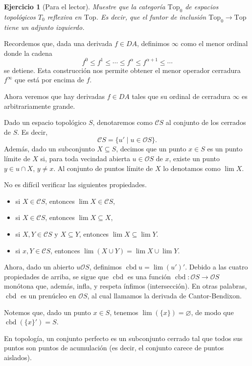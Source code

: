 \documentclass[12pt,letterpaper,titlepage]{article}
\let\emptyset\varnothing
\newtheorem{exe}{Ejercicio}
\theoremstyle{definition}
\renewcommand\cal[1]{\mathcal{#1}}
\newcommand\<{\langle}
\renewcommand\>{\rangle}
\newcommand{\Top}{\mathrm{Top}}
\DeclareMathOperator{\cbd}{cbd}
\begin{document}
\begin{exe}[Para el lector]
    Muestre que la categoría $\Top_0$ de espacios topológicos
    $T_0$ reflexiva en $\Top$.
    Es decir, que el funtor de inclusión $\Top_0\to\Top$
    tiene un adjunto izquierdo.
\end{exe}

Recordemos que, dada una derivada $f\in DA$,
definimos $\infty$ como el menor ordinal donde la cadena
\[
    f^0\leq f^1\leq \cdots\leq f^\alpha \leq f^{\alpha+1} \leq \cdots
\]
se detiene.
Esta construcción nos permite obtener
el menor operador cerradura $f^\infty$
que está por encima de $f$.

Ahora veremos que hay derivadas $f\in DA$ tales que
su ordinal de cerradura $\infty$ es arbitrariamente grande.

Dado un espacio topológico $S$,
denotaremos como $\cal CS$ al conjunto de los cerrados de $S$.
Es decir,
\[
    \cal CS = \{u'\mid u\in\cal OS\}
.\]
Además, dado un subconjunto $X\subseteq S$,
decimos que un punto $x\in S$ es un punto límite de $X$ si,
para toda vecindad abierta $u\in\cal OS$ de $x$,
existe un punto $y\in u\cap X$, $y\neq x$.
Al conjunto de puntos límite de $X$ lo denotamos como $\lim X$.

No es difícil verificar las siguientes propiedades.
\begin{itemize}
    \item si $X\in\cal CS$, entonces $\lim X\in\cal CS$,
    \item si $X\in\cal CS$, entonces $\lim X\subseteq X$,
    \item si $X,Y\in\cal CS$ y $X\subseteq Y$,
        entonces $\lim X\subseteq\lim Y$.
    \item si $x,Y\in\cal CS$,
        entonces $\lim(X\cup Y)=\lim X\cup\lim Y$.
\end{itemize}

Ahora, dado un abierto $u\cal OS$, definimos $\cbd u = \lim(u')'$.
Debido a las cuatro propiedades de arriba,
se sigue que $\cbd$ es una función $\cbd:\cal OS\to\cal OS$
monótona que, además, infla, y respeta ínfimos (intersección).
En otras palabras, $\cbd$ es un prenúcleo en $\cal OS$,
al cual llamamos la derivada de Cantor-Bendixon.

Notemos que, dado un punto $x\in S$,
tenemos $\lim(\{x\})=\emptyset$,
de modo que $\cbd(\{x\}')=S$.

En topología, un conjunto perfecto es un subconjunto cerrado tal que todos sus puntos son puntos de acumulación (es decir, el conjunto carece de puntos aislados).
\end{document}
